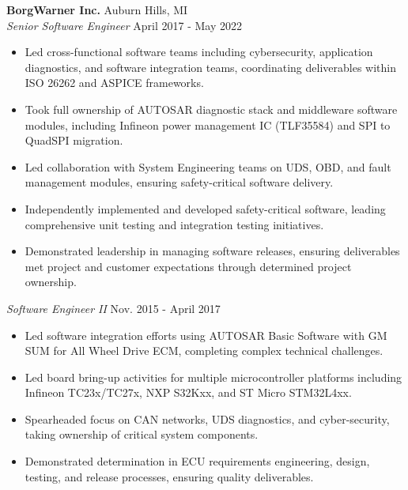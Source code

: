 \vspace{0.75em}

\noindent
\textbf{BorgWarner Inc.} \hfill Auburn Hills, MI \\
\textit{Senior Software Engineer} \hfill April 2017 - May 2022 \\
\begin{itemize}[leftmargin=*,noitemsep,topsep=3pt]
    \item Led cross-functional software teams including cybersecurity, application diagnostics, and software integration teams, coordinating deliverables within ISO 26262 and ASPICE frameworks.
    \item Took full ownership of AUTOSAR diagnostic stack and middleware software modules, including Infineon power management IC (TLF35584) and SPI to QuadSPI migration.
    \item Led collaboration with System Engineering teams on UDS, OBD, and fault management modules, ensuring safety-critical software delivery.
    \item Independently implemented and developed safety-critical software, leading comprehensive unit testing and integration testing initiatives.
    \item Demonstrated leadership in managing software releases, ensuring deliverables met project and customer expectations through determined project ownership.
\end{itemize}

\vspace{0.5em}

\noindent
\textit{Software Engineer II} \hfill Nov. 2015 - April 2017 \\
\begin{itemize}[leftmargin=*,noitemsep,topsep=3pt]
    \item Led software integration efforts using AUTOSAR Basic Software with GM SUM for All Wheel Drive ECM, completing complex technical challenges.
    \item Led board bring-up activities for multiple microcontroller platforms including Infineon TC23x/TC27x, NXP S32Kxx, and ST Micro STM32L4xx.
    \item Spearheaded focus on CAN networks, UDS diagnostics, and cyber-security, taking ownership of critical system components.
    \item Demonstrated determination in ECU requirements engineering, design, testing, and release processes, ensuring quality deliverables.
\end{itemize}